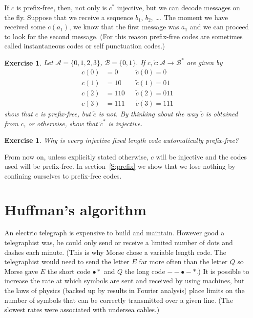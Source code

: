 \documentclass[12pt,a4paper]{article}
\theoremstyle{plain}
\newtheorem{exercise}[theorem]{Exercise}
\theoremstyle{definition}
\begin{document}
    If $c$ is prefix-free, then, not only is $c^{*}$ injective, but we can decode
    messages on the fly. Suppose that we receive a sequence
    $b_{1}$, $b_{2}$, \dots.
    The moment we have received some $c(a_{1})$, we know that
    the first message was $a_{1}$
    and we can proceed to look for the second message. (For this reason
    prefix-free codes
    are sometimes called instantaneous codes or self punctuation codes.)
    \begin{exercise}
        Let  ${\mathcal A}=\{0,1,2,3\}$, ${\mathcal B}=\{0,1\}$.
        If $c,\tilde{c}:{\mathcal A}\rightarrow{\mathcal B}^{*}$ are given by
        \begin{align*}
            c(0)&=0&&\tilde{c}(0)=0\\
            c(1)&=10&&\tilde{c}(1)=01\\
            c(2)&=110&&\tilde{c}(2)=011\\
            c(3)&=111&&\tilde{c}(3)=111
        \end{align*}
        show that $c$ is prefix-free, but $\tilde{c}$ is not.
        By thinking about the way $\tilde{c}$ is obtained from $c$, or otherwise,
        show that $\tilde{c}^{*}$ is injective.
    \end{exercise}
    \begin{exercise}
        \label{E;auto free}
        Why is every injective fixed
        length code automatically prefix-free?
    \end{exercise}
    From now on, unless explicitly stated otherwise, $c$ will be injective
    and the codes used will be prefix-free. In section~\ref{S;prefix}
    we show
    that we lose nothing by confining ourselves to prefix-free codes.
    \section{Huffman's algorithm} An electric telegraph is expensive
    to build and maintain. However good a telegraphist was,
    he could only send or receive a limited number of dots and dashes
    each minute. (This is why Morse chose a variable length code.
    The telegraphist would need to send the letter $E$ far more often than
    the letter $Q$ so Morse gave $E$ the short
    code $\bullet*$ and $Q$ the long code $--\bullet-*$.)
    It is possible to increase the rate at which symbols are
    sent and received by using machines, but the laws of
    physics (backed up by results in Fourier analysis)
    place limits on the number of symbols that can be
    correctly transmitted over a given line.
    (The slowest rates were associated with undersea cables.)
\end{document}
